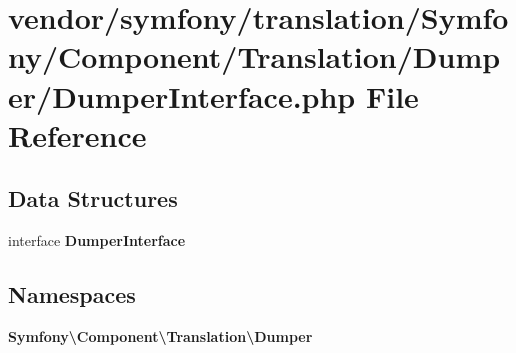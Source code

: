 \section{vendor/symfony/translation/\+Symfony/\+Component/\+Translation/\+Dumper/\+Dumper\+Interface.php File Reference}
\label{translation_2_symfony_2_component_2_translation_2_dumper_2_dumper_interface_8php}
\subsection*{Data Structures}
\begin{DoxyCompactItemize}
\item 
interface {\bf Dumper\+Interface}
\end{DoxyCompactItemize}
\subsection*{Namespaces}
\begin{DoxyCompactItemize}
\item 
 {\bf Symfony\textbackslash{}\+Component\textbackslash{}\+Translation\textbackslash{}\+Dumper}
\end{DoxyCompactItemize}
